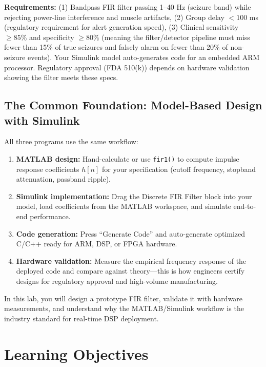 \documentclass[11pt,letterpaper]{article}
\begin{document}
\textbf{Requirements:} (1) Bandpass FIR filter passing 1--40 Hz (seizure band) while rejecting power-line interference and muscle artifacts, (2) Group delay $< 100$ ms (regulatory requirement for alert generation speed), (3) Clinical sensitivity $\geq 85\%$ and specificity $\geq 80\%$ (meaning the filter/detector pipeline must miss fewer than 15\% of true seizures and falsely alarm on fewer than 20\% of non-seizure events). Your Simulink model auto-generates code for an embedded ARM processor. Regulatory approval (FDA 510(k)) depends on hardware validation showing the filter meets these specs.

\subsection{The Common Foundation: Model-Based Design with Simulink}

All three programs use the same workflow:

\begin{enumerate}
    \item \textbf{MATLAB design:} Hand-calculate or use \texttt{fir1()} to compute impulse response coefficients $h[n]$ for your specification (cutoff frequency, stopband attenuation, passband ripple).
    \item \textbf{Simulink implementation:} Drag the Discrete FIR Filter block into your model, load coefficients from the MATLAB workspace, and simulate end-to-end performance.
    \item \textbf{Code generation:} Press ``Generate Code'' and auto-generate optimized C/C++ ready for ARM, DSP, or FPGA hardware.
    \item \textbf{Hardware validation:} Measure the empirical frequency response of the deployed code and compare against theory—this is how engineers certify designs for regulatory approval and high-volume manufacturing.
\end{enumerate}

\noindent
In this lab, you will design a prototype FIR filter, validate it with hardware measurements, and understand why the MATLAB/Simulink workflow is the industry standard for real-time DSP deployment.

\clearpage

\section{Learning Objectives}
\end{document}
